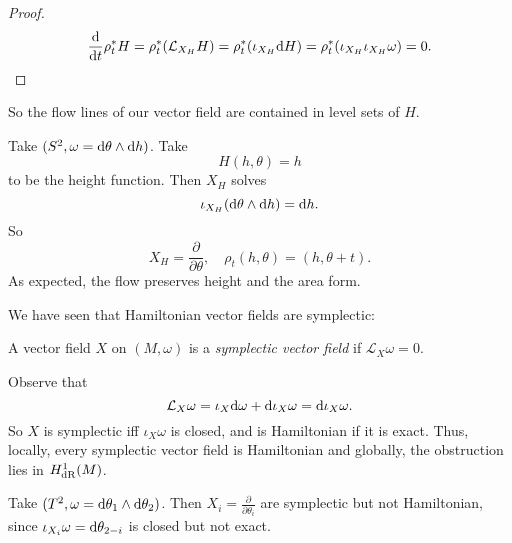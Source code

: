 \documentclass[a4paper]{article}
\begin{document}
\begin{proof}
  \[
    \frac{\mathrm{d}}{\mathrm{d} t} \rho_t^* H = \rho_t^* (\mathcal{L}_{X_H}H) = \rho_t^* (\iota_{X_H} \mathrm{d} H) = \rho_t^* (\iota_{X_H} \iota_{X_H}\omega) = 0.\qedhere
  \]
\end{proof}

So the flow lines of our vector field are contained in level sets of $H$.
\begin{eg}
  Take $(S^2, \omega = \mathrm{d} \theta \wedge \mathrm{d} h)$. Take
  \[
    H(h, \theta) = h
  \]
  to be the height function. Then $X_H$ solves
  \[
    \iota_{X_H} (\mathrm{d} \theta \wedge \mathrm{d} h) = \mathrm{d} h.
  \]
  So
  \[
    X_H = \frac{\partial}{\partial \theta},\quad \rho_t(h, \theta) = (h, \theta + t).
  \]
  As expected, the flow preserves height and the area form.
  \begin{center}
  \end{center}
\end{eg}

We have seen that Hamiltonian vector fields are symplectic:
\begin{defi}
  A vector field $X$ on $(M, \omega)$ is a \emph{symplectic vector field} if $\mathcal{L}_X \omega = 0$.
\end{defi}
Observe that
\[
  \mathcal{L}_X \omega= \iota_X \mathrm{d} \omega + \mathrm{d} \iota_X \omega = \mathrm{d} \iota_X \omega.
\]
So $X$ is symplectic iff $\iota_X \omega$ is closed, and is Hamiltonian if it is exact. Thus, locally, every symplectic vector field is Hamiltonian and globally, the obstruction lies in $H^1_{\mathrm{dR}}(M)$.

\begin{eg}
  Take $(T^2, \omega = \mathrm{d} \theta_1 \wedge \mathrm{d} \theta_2)$. Then $X_i = \frac{\partial}{\partial \theta_i}$ are symplectic but not Hamiltonian, since $\iota_{X_i} \omega = \mathrm{d} \theta_{2 - i}$ is closed but not exact.
\end{eg}
\end{document}
